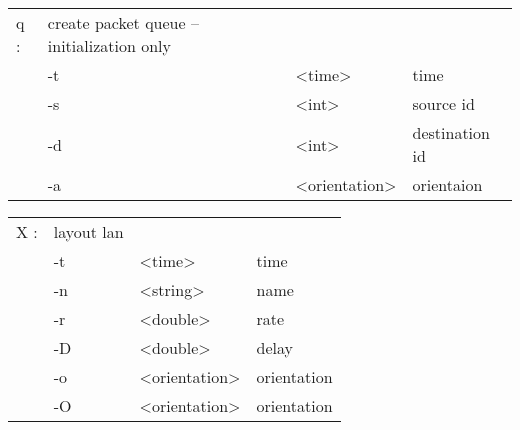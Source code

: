  \begin{tabular}{llll}
  q : & create packet queue -- initialization only & & \\
    &  -t & <time> & time \\
    &  -s & <int> & source id \\
    &  -d & <int> & destination id \\
    &  -a & <orientation> & orientaion \\
  \end{tabular}

  \begin{tabular}{llll}
  X : & layout lan & & \\
    &  -t & <time> & time \\
    &  -n & <string> & name \\
    &  -r & <double> & rate \\
    &  -D & <double> & delay \\
    &  -o & <orientation> & orientation \\
    &  -O & <orientation> & orientation \\
  \end{tabular}

